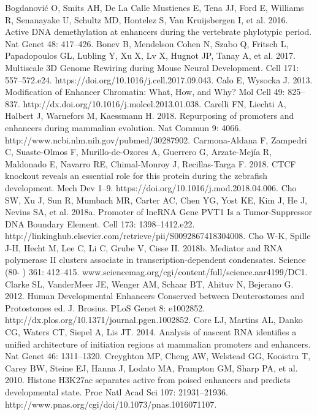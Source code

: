 \begin{thebibliography}{1}
	 Bogdanović O, Smits AH, De La Calle Mustienes E, Tena JJ, Ford E, Williams R, Senanayake U, Schultz MD, Hontelez S, Van Kruijsbergen I, et al. 2016. Active DNA demethylation at enhancers during the vertebrate phylotypic period. Nat Genet 48: 417–426.
	 Bonev B, Mendelson Cohen N, Szabo Q, Fritsch L, Papadopoulos GL, Lubling Y, Xu X, Lv X, Hugnot JP, Tanay A, et al. 2017. Multiscale 3D Genome Rewiring during Mouse Neural Development. Cell 171: 557–572.e24. https://doi.org/10.1016/j.cell.2017.09.043.
	 Calo E, Wysocka J. 2013. Modification of Enhancer Chromatin: What, How, and Why? Mol Cell 49: 825–837. http://dx.doi.org/10.1016/j.molcel.2013.01.038.
	 Carelli FN, Liechti A, Halbert J, Warnefors M, Kaessmann H. 2018. Repurposing of promoters and enhancers during mammalian evolution. Nat Commun 9: 4066. http://www.ncbi.nlm.nih.gov/pubmed/30287902.
	 Carmona-Aldana F, Zampedri C, Suaste-Olmos F, Murillo-de-Ozores A, Guerrero G, Arzate-Mejía R, Maldonado E, Navarro RE, Chimal-Monroy J, Recillas-Targa F. 2018. CTCF knockout reveals an essential role for this protein during the zebrafish development. Mech Dev 1–9. https://doi.org/10.1016/j.mod.2018.04.006.
	 Cho SW, Xu J, Sun R, Mumbach MR, Carter AC, Chen YG, Yost KE, Kim J, He J, Nevins SA, et al. 2018a. Promoter of lncRNA Gene PVT1 Is a Tumor-Suppressor DNA Boundary Element. Cell 173: 1398–1412.e22. http://linkinghub.elsevier.com/retrieve/pii/S0092867418304008.
	 Cho W-K, Spille J-H, Hecht M, Lee C, Li C, Grube V, Cisse II. 2018b. Mediator and RNA polymerase II clusters associate in transcription-dependent condensates. Science (80- ) 361: 412–415. www.sciencemag.org/cgi/content/full/science.aar4199/DC1.
	 Clarke SL, VanderMeer JE, Wenger AM, Schaar BT, Ahituv N, Bejerano G. 2012. Human Developmental Enhancers Conserved between Deuterostomes and Protostomes ed. J. Brosius. PLoS Genet 8: e1002852. http://dx.plos.org/10.1371/journal.pgen.1002852.
	 Core LJ, Martins AL, Danko CG, Waters CT, Siepel A, Lis JT. 2014. Analysis of nascent RNA identifies a unified architecture of initiation regions at mammalian promoters and enhancers. Nat Genet 46: 1311–1320.
	 Creyghton MP, Cheng AW, Welstead GG, Kooistra T, Carey BW, Steine EJ, Hanna J, Lodato MA, Frampton GM, Sharp PA, et al. 2010. Histone H3K27ac separates active from poised enhancers and predicts developmental state. Proc Natl Acad Sci 107: 21931–21936. http://www.pnas.org/cgi/doi/10.1073/pnas.1016071107.

\end{thebibliography}

